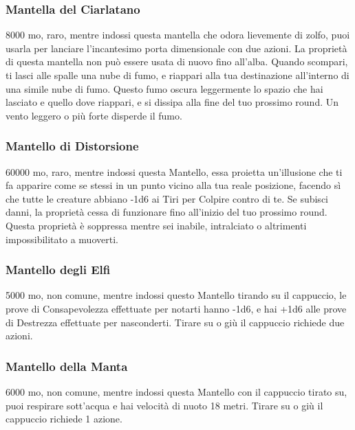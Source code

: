 \begin{multicols}{2}
	\subsubsection*{Mantella del Ciarlatano}
	8000 mo, raro, mentre indossi questa mantella che odora lievemente di zolfo, puoi usarla per lanciare l'incantesimo porta dimensionale con due azioni. La proprietà di questa mantella non può essere usata di nuovo fino all'alba. Quando scompari, ti lasci alle spalle una nube di fumo, e riappari alla tua destinazione all'interno di una simile nube di fumo. Questo fumo oscura leggermente lo spazio che hai lasciato e quello dove riappari, e si dissipa alla fine del tuo prossimo round. Un vento leggero o più forte disperde il fumo.

	\subsubsection*{Mantello di Distorsione}
	60000 mo, raro, mentre indossi questa Mantello, essa proietta un'illusione che ti fa apparire come se stessi in un punto vicino alla tua reale posizione, facendo sì che tutte le creature abbiano -1d6 ai Tiri per Colpire contro di te. Se subisci danni, la proprietà cessa di funzionare fino all'inizio del tuo prossimo round. Questa proprietà è soppressa mentre sei inabile, intralciato o altrimenti impossibilitato a muoverti.

	\subsubsection*{Mantello degli Elfi}
	5000 mo, non comune, mentre indossi questo Mantello tirando su il cappuccio, le prove di Consapevolezza effettuate per notarti hanno -1d6, e hai +1d6 alle prove di Destrezza effettuate per nasconderti. Tirare su o giù il cappuccio richiede due azioni.

	\subsubsection*{Mantello della Manta}
	6000 mo, non comune, mentre indossi questa Mantello con il cappuccio tirato su, puoi respirare sott'acqua e hai velocità di nuoto 18 metri. Tirare su o giù il cappuccio richiede 1 azione.


\end{multicols}
